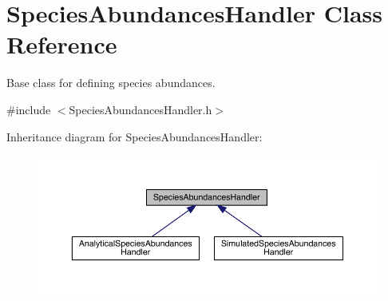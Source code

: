 \hypertarget{class_species_abundances_handler}{}\section{Species\+Abundances\+Handler Class Reference}
\label{class_species_abundances_handler}


Base class for defining species abundances.  




{\ttfamily \#include $<$Species\+Abundances\+Handler.\+h$>$}



Inheritance diagram for Species\+Abundances\+Handler\+:
\nopagebreak
\begin{figure}[H]
\begin{center}
\leavevmode
\includegraphics[width=350pt]{class_species_abundances_handler__inherit__graph}
\end{center}
\end{figure}
